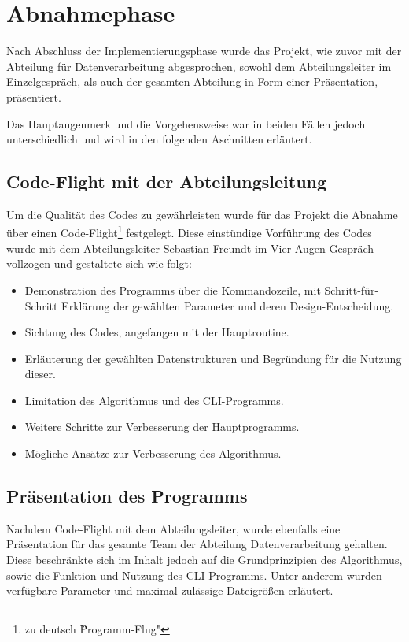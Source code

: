 \section{Abnahmephase}
\label{section:abnahmephase}
Nach Abschluss der Implementierungsphase wurde das Projekt, wie zuvor mit der
Abteilung für Datenverarbeitung abgesprochen, sowohl dem Abteilungsleiter im Einzelgespräch,
als auch der gesamten Abteilung in Form einer Präsentation, präsentiert.

Das Hauptaugenmerk und die Vorgehensweise war in beiden Fällen jedoch unterschiedlich
und wird in den folgenden Aschnitten erläutert.

\subsection{Code-Flight mit der Abteilungsleitung}

Um die Qualität des Codes zu gewährleisten wurde für das Projekt die Abnahme über einen Code-Flight\footnote{zu deutsch \"Programm-Flug"} festgelegt. Diese einstündige
Vorführung des Codes wurde mit dem Abteilungsleiter Sebastian Freundt im
Vier-Augen-Gespräch vollzogen und gestaltete sich wie folgt:

\begin{itemize}
    \item Demonstration des Programms über die Kommandozeile, mit Schritt-für-Schritt Erklärung der gewählten Parameter und deren Design-Entscheidung.
    \item Sichtung des Codes, angefangen mit der Hauptroutine.
    \item Erläuterung der gewählten Datenstrukturen und Begründung für die Nutzung dieser.
    \item Limitation des Algorithmus und des CLI-Programms.
    \item Weitere Schritte zur Verbesserung der Hauptprogramms.
    \item Mögliche Ansätze zur Verbesserung des Algorithmus.
\end{itemize}

\subsection{Präsentation des Programms}

Nachdem Code-Flight mit dem Abteilungsleiter, wurde ebenfalls
eine Präsentation für das gesamte Team der Abteilung Datenverarbeitung gehalten.
Diese beschränkte sich im Inhalt jedoch auf die Grundprinzipien des Algorithmus, sowie
die Funktion und Nutzung des CLI-Programms. Unter anderem wurden verfügbare
Parameter und maximal zulässige Dateigrößen erläutert.
